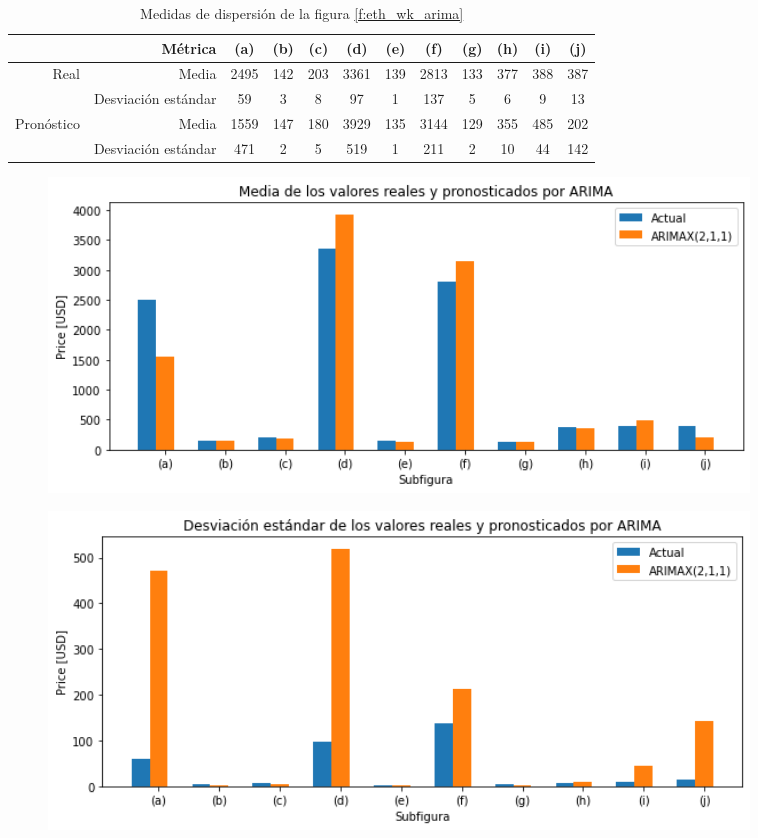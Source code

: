 \documentclass[a4paper,10pt]{article}
\begin{document}
\begin{table}[H]
 \begin{center}
 \resizebox{12cm}{!} {
  \begin{tabular}{|r|r|c|c|c|c|c|c|c|c|c|c|}
    & Métrica & (a) & (b) & (c) & (d) & (e) & (f) & (g) & (h) & (i) & (j) \\ \hline
    Real & Media & 2495& 142& 203& 3361& 139& 2813& 133& 377& 388& 387 \\
    & Desviación estándar & 59& 3& 8& 97& 1& 137& 5& 6& 9& 13 \\
    Pronóstico & Media & 1559& 147& 180& 3929& 135& 3144& 129& 355& 485& 202 \\
    & Desviación estándar & 471& 2& 5& 519& 1& 211& 2& 10& 44& 142 \\ \hline
  \end{tabular}
  }
  \caption{Medidas de dispersión de la figura \ref{f:eth_wk_arima}}
  \label{tab:eth_wk_avestd}
 \end{center}
\end{table}

\begin{figure}[H]
\centering
\includegraphics[width=0.9\textwidth]{./plots/arima/plots_eth_random_weekly/ave}
\label{f:eth_ave_wk}
\end{figure}


\begin{figure}[H]
\centering
\includegraphics[width=0.9\textwidth]{./plots/arima/plots_eth_random_weekly/std}
\label{f:eth_std_wk}
\end{figure}
\end{document}
